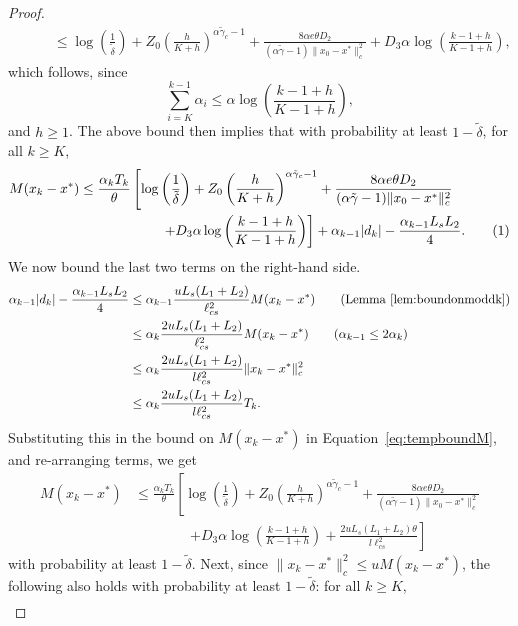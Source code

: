 \documentclass{article}
\newcommand{\numberthis}{\addtocounter{equation}{1}\tag{\theequation}}
\newcommand{\lrp}[1]{\left( #1 \right)}
\newcommand{\lcs}{\ell_{cs}}
\begin{document}
\begin{proof}
\begin{align*}
&\qquad \le \log\left(\frac{1}{\tilde{\delta}}\right) + Z_0\lrp{\frac{h}{K+h}}^{\alpha\tilde{\gamma}_c - 1}+ \frac{8\alpha e \theta D_2}{(\alpha \tilde{\gamma} - 1)\|x_0 - x^*\|^2_c}  + D_3 \alpha \log\left(\frac{k-1+h}{K-1+h}\right),
\end{align*}
which follows, since
\[ \sum\limits_{i=K}^{k-1} \alpha_i \le \alpha \log\left(\frac{k-1+h}{K-1+h}\right), \]
and $h\ge 1$.
The above bound then implies that with probability at least $1 - \tilde{\delta}$, for all $k\ge K$, 
\begin{align*}
    M(x_k - x^*) & \le \frac{\alpha_k T_k}{\theta} \left[ \log\left(\frac{1}{\tilde{\delta}}\right) + Z_0\lrp{\frac{h}{K+h}}^{\alpha\tilde{\gamma}_c - 1} + \frac{8\alpha e \theta D_2}{(\alpha \tilde{\gamma} - 1)\|x_0 - x^*\|^2_c}  \right. \\
    &\qquad\qquad\qquad \left. + {D_3 \alpha } \log\left(\frac{k-1+h}{K-1+h}\right) \right] + \alpha_{k-1}|d_k| - \frac{\alpha_{k-1} L_sL_2}{4}. \numberthis\label{eq:tempboundM} 
\end{align*}
We now bound the last two terms on the right-hand side.
\begin{align*}
    \alpha_{k-1}|d_k| - \frac{\alpha_{k-1} L_sL_2 }{4}
    &\le \alpha_{k-1} \frac{u L_s (L_1 + L_2)}{\lcs^2} M(x_k - x^*) \tag{Lemma~\ref{lem:boundonmoddk}}\\
    &\le \alpha_{k}\frac{2 u L_s (L_1 + L_2)}{ \lcs^2} M(x_k - x^*)  \tag{$\alpha_{k-1}\le 2\alpha_k$}\\
    &\le \alpha_{k}\frac{2 u L_s (L_1 + L_2)}{ l\lcs^2} \|x_k - x^*\|^2_c\\
    &\le \alpha_{k}\frac{ 2 u L_s (L_1 + L_2)}{l \lcs^2} T_k.
\end{align*}
Substituting this in the bound on $M(x_k - x^*)$ in Equation~\eqref{eq:tempboundM}, and re-arranging terms, we get 
\begin{align*}
    M(x_k - x^*) & \le \frac{\alpha_k T_k}{\theta} \left[ \log\left(\frac{1}{\tilde{\delta}}\right) + Z_0\lrp{\frac{h}{K+h}}^{\alpha\tilde{\gamma}_c - 1} + \frac{8\alpha e \theta D_2}{(\alpha \tilde{\gamma} - 1)\|x_0 - x^*\|^2_c}  \right. \\
    &\qquad\qquad \left. + {D_3 \alpha } \log\left(\frac{k-1+h}{K-1+h}\right) + \frac{ 2u L_s (L_1 + L_2) \theta }{ l\lcs^2} \right]
\end{align*}
with probability at least $1 - \tilde{\delta}$. Next, since $\|x_k - x^*\|^2_c \le u M(x_k - x^*)$, the following also holds with probability at least $1- \tilde{\delta}$:  for all $k\ge K$,
\begin{align*}

\end{align*}
\end{proof}
\end{document}
